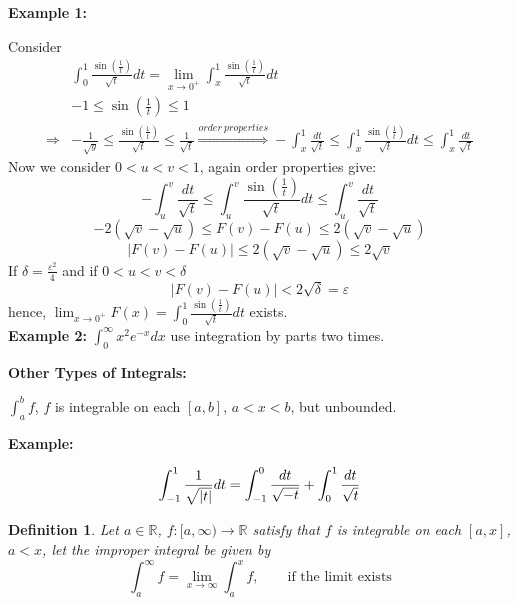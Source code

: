 \documentclass[12pt]{article}
\theoremstyle{plain}
\newtheorem{definition}{Definition}[subsection]
\newcommand{\abs}[1]{\left| #1 \right|}
\newcommand{\mR}{{\mathbb{R}}}
\newcommand{\ep}{\varepsilon}
\begin{document}
{\color{Brown}
\textbf{Example 1: }

Consider 
\begin{align*}
	&\int_0^1 \frac{\sin (\frac 1t)}{\sqrt t} dt = \lim_{x\to 0^+} 
	\int_x^1 \frac{\sin(\frac 1t)}{\sqrt t} dt\\ 
	&-1 \leq \sin (\frac 1t) \leq 1 \\
	\Rightarrow & -\frac1{\sqrt y} \leq \frac{\sin(\frac 1t)}{\sqrt t}
	\leq \frac1{\sqrt t} 
	\overset{order\ properties}{\Rightarrow} -\int_x^1 \frac{dt}{\sqrt t}
	\leq \int_x^1 \frac{\sin(\frac 1t)}{\sqrt t} dt
	\leq \int_x^1 \frac{dt}{\sqrt t}
\end{align*}
Now we consider $0< u< v < 1$, again order properties give:
\[
	-\int_u^v \frac{dt}{\sqrt t} 
	\leq \int_u^v \frac{\sin(\frac 1t)}{\sqrt t} dt
	\leq \int_u^v \frac{dt}{\sqrt t}
\]
\[
	-2(\sqrt v- \sqrt u) \leq F(v) - F(u) \leq 2 (\sqrt v - \sqrt u)
\]
\[	
	\abs{F(v) - F(u)} \leq 2 (\sqrt v - \sqrt u) \leq 2\sqrt v
\]
If $\delta = \frac{\ep^2}{4}$ and if $0<u<v<\delta$
\[
	\abs{F(v) - F(u)} < 2\sqrt{\delta} = \ep
\]
hence, $\lim_{x\to 0 ^+}F(x)=\int_0^1 \frac{\sin(\frac 1t)}{\sqrt t}dt$
exists. \\


\textbf{Example 2:} $\int_0^{\infty} x^2 e^{-x} dx$ use integration by parts
two times. \\
}



\textbf{Other Types of Integrals: }

$\int_a^b f$, $f$ is integrable on each $[a,b]$, $a < x < b$, but unbounded. 

{\color{Brown}
	\textbf{Example: }

	\[
		\int_{-1}^1 \frac1{\sqrt{\abs t}}dt = \int_{-1}^0 \frac {dt}{\sqrt{-t}}
		+ \int_0^1 \frac{dt}{\sqrt t}\\
	\]
}


\begin{definition}
	Let $a \in \mR$, $f : [a, \infty) \to \mR$ satisfy that $f$ is integrable
	on each $[a,x]$, $a<x$, let the improper integral be given by 
	\[
		\int_a^{\infty} f = \lim_{x\to \infty} \int_a^x f, \qquad 
		\text{if the limit exists}
	\]
\end{definition}







\end{document}
